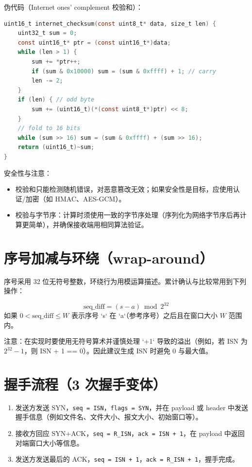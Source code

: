 \documentclass[11pt,a4paper]{article}
\begin{document}
伪代码（Internet ones' complement 校验和）：

\begin{lstlisting}[language=C]
uint16_t internet_checksum(const uint8_t* data, size_t len) {
    uint32_t sum = 0;
    const uint16_t* ptr = (const uint16_t*)data;
    while (len > 1) {
        sum += *ptr++;
        if (sum & 0x10000) sum = (sum & 0xffff) + 1; // carry
        len -= 2;
    }
    if (len) { // odd byte
        sum += (uint16_t)(*(const uint8_t*)ptr) << 8;
    }
    // fold to 16 bits
    while (sum >> 16) sum = (sum & 0xffff) + (sum >> 16);
    return (uint16_t)~sum;
}
\end{lstlisting}

安全性与注意：
\begin{itemize}
  \item 校验和只能检测随机错误，对恶意篡改无效；如果安全性是目标，应使用认证/加密（如 HMAC、AES-GCM）。
  \item 校验与字节序：计算时须使用一致的字节序处理（序列化为网络字节序后再计算更简单），并确保接收端用相同算法验证。
\end{itemize}

\section{序号加减与环绕（wrap-around）}
序号采用 32 位无符号整数，环绕行为用模运算描述。累计确认与比较常用到下列操作：

\[
\text{seq\_diff} = (s - a) \bmod 2^{32}
\]
如果 $0 < \text{seq\_diff} \le W$ 表示序号 `s` 在 `a`（参考序号）之后且在窗口大小 $W$ 范围内。

注意：在实现时要使用无符号算术并谨慎处理 `+1` 导致的溢出（例如，若 ISN 为 $2^{32}-1$，则 ISN + 1 == 0）。因此建议生成 ISN 时避免 0 与最大值。

\section{握手流程（3 次握手变体）}
\begin{enumerate}
  \item 发送方发送 SYN，\texttt{seq = ISN}，\texttt{flags = SYN}，并在 payload 或 header 中发送握手信息（例如文件名、文件大小、报文大小、初始窗口等）。
  \item 接收方回应 SYN+ACK，\texttt{seq = R\_ISN}，\texttt{ack = ISN + 1}，在 payload 中返回对端窗口大小等信息。
  \item 发送方发送最后的 ACK，\texttt{seq = ISN + 1}，\texttt{ack = R\_ISN + 1}，握手完成。
\end{enumerate}
\end{document}
